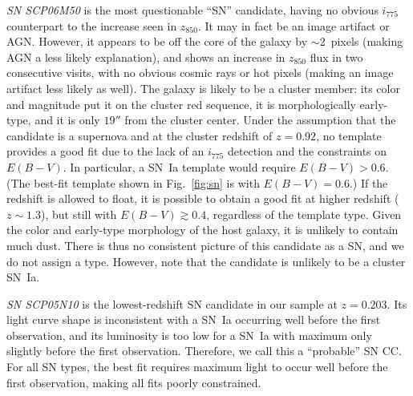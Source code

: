 {\it SN SCP06M50} is the most questionable ``SN'' candidate, having no
obvious $i_{775}$ counterpart to the increase seen in $z_{850}$. It
may in fact be an image artifact or AGN. However, it appears to be off
the core of the galaxy by $\sim$2~pixels (making AGN a less likely
explanation), and shows an increase in $z_{850}$ flux in two
consecutive visits, with no obvious cosmic rays or hot pixels (making
an image artifact less likely as well). The galaxy is likely to be a
cluster member: its color and magnitude put it on the cluster red
sequence, it is morphologically early-type, and it is only $19''$ from
the cluster center. Under the assumption that the candidate is a
supernova and at the cluster redshift of $z=0.92$, no template
provides a good fit due to the lack of an $i_{775}$ detection and the
constraints on $E(B-V)$. In particular, a SN~Ia template would
require $E(B-V)>0.6$. (The best-fit template shown in
Fig.~\ref{fig:sn} is with $E(B-V) = 0.6$.) If the redshift is allowed
to float, it is possible to obtain a good fit at higher redshift
($z \sim 1.3$), but still with $E(B-V) \gtrsim 0.4$, regardless of the
template type. Given the color and early-type morphology of the host
galaxy, it is unlikely to contain much dust. There is thus no
consistent picture of this candidate as a SN, and we do not assign a
type. However, note that the candidate is unlikely to be a cluster
SN~Ia.

{\it SN SCP05N10} is the lowest-redshift SN candidate in our sample at
$z=0.203$. Its light curve shape is inconsistent with a SN~Ia occurring
well before the first observation, and its luminosity is too low for
a SN~Ia with maximum only slightly before the first
observation. Therefore, we call this a ``probable'' SN CC. For all SN
types, the best fit requires maximum light to occur well before the
first observation, making all fits poorly constrained.



